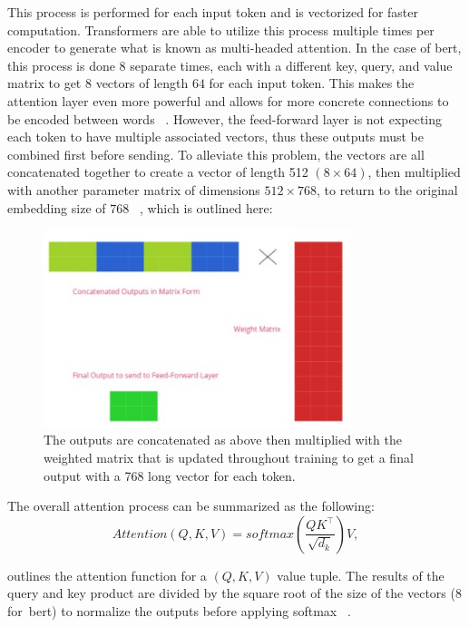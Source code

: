 This process is performed for each input token and is vectorized for faster computation. Transformers are able to utilize this process multiple times per encoder to generate what is known as multi-headed attention. In the case of \acrshort{bert}, this process is done $8$ separate times, each with a different key, query, and value matrix to get $8$ vectors of length $64$ for each input token. This makes the attention layer even more powerful and allows for more concrete connections to be encoded between words ~\parencite{transformers:}. However, the feed-forward layer is not expecting each token to have multiple associated vectors, thus these outputs must be combined first before sending. To alleviate this problem, the vectors are all concatenated together to create a vector of length 512 $(8 \times 64)$, then multiplied with another parameter matrix of dimensions $512 \times 768$, to return to the original embedding size of $768$ ~\parencite{devlin2019bert:}, which is outlined here:

\begin{figure}[H]
\centering
\includegraphics[width=0.8\textwidth]{fig/multi-head.jpg}
\caption{The outputs are concatenated as above then multiplied with the weighted matrix that is updated throughout training to get a final output with a 768 long vector for each token.
}
\label{fig:multi_head_attention}
\end{figure}

The overall attention process can be summarized as the following:
\begin{equation}
\label{eq:attention}
Attention\left(Q, K, V\right) = softmax\left(\frac{QK^\top}{\sqrt{d_k}}\right)V, 
\end{equation}

 outlines the attention function for a $(Q,K,V)$ value tuple. The results of the query and key product are divided by the square root of the size of the vectors (8 for~\acrshort{bert}) to normalize the outputs before applying softmax ~\parencite{transformers:}.

